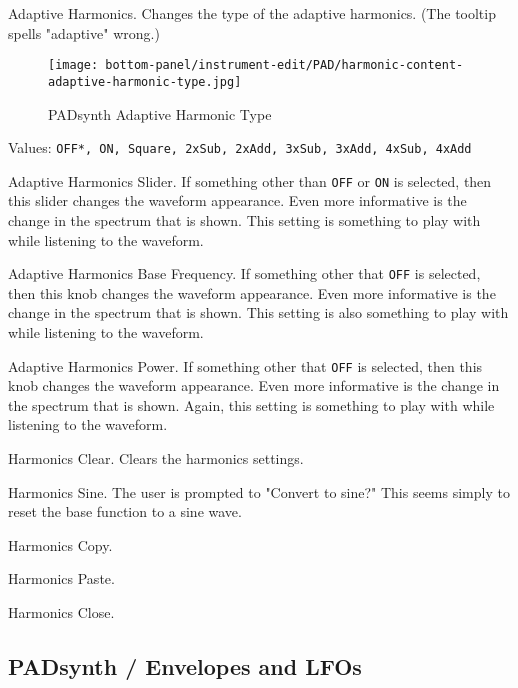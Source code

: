    Adaptive Harmonics.
   Changes the type of the adaptive harmonics.
   (The tooltip spells "adaptive" wrong.)

\begin{figure}[H]
   \centering
   \texttt{[image: bottom-panel/instrument-edit/PAD/harmonic-content-adaptive-harmonic-type.jpg]}
   \caption{PADsynth Adaptive Harmonic Type}
   \label{fig:padsynth_adaptive_harmonic_type}
\end{figure}

   Values: \texttt{OFF*, ON, Square, 2xSub, 2xAdd, 3xSub, 3xAdd, 4xSub, 4xAdd}

   Adaptive Harmonics Slider.
   If something other than \texttt{OFF} or \texttt{ON} is selected,
   then this slider changes the waveform appearance.
   Even more informative is the change in the spectrum that is shown.
   This setting is something to play with while listening to the
   waveform.

   Adaptive Harmonics Base Frequency.
   If something other that \texttt{OFF} is selected,
   then this knob changes the waveform appearance.
   Even more informative is the change in the spectrum that is shown.
   This setting is also something to play with while listening to the
   waveform.

   Adaptive Harmonics Power.
   If something other that \texttt{OFF} is selected,
   then this knob changes the waveform appearance.
   Even more informative is the change in the spectrum that is shown.
   Again, this setting is something to play with while listening to the
   waveform.

   Harmonics Clear.
   Clears the harmonics settings.

   Harmonics Sine.
   The user is prompted to "Convert to sine?"
   This seems simply to reset the base function to a sine wave.

   Harmonics Copy.

   Harmonics Paste.

   Harmonics Close.

\subsection{PADsynth / Envelopes and LFOs}
\label{subsec:padsynth_envelopes_lfos}

